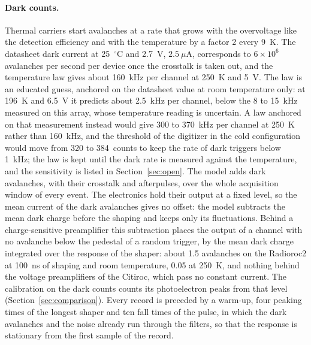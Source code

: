 \documentclass[11pt]{article}
\begin{document}
\paragraph{Dark counts.} Thermal carriers start avalanches at a rate that
grows with the overvoltage like the detection efficiency and with the
temperature by a factor 2 every 9~K. The datasheet dark current at
25~$^\circ$C and 2.7~V, $2.5~\mu$A, corresponds to $6 \times 10^6$
avalanches per second per device once the crosstalk is taken out, and the
temperature law gives about 160~kHz per channel at 250~K and 5~V. The law
is an educated guess, anchored on the datasheet value at room temperature
only: at 196~K
and 6.5~V it predicts about 2.5~kHz per channel, below the 8 to 15~kHz
measured on this array, whose temperature reading is uncertain. A law
anchored on that measurement instead would give 300 to 370~kHz per channel
at 250~K rather than 160~kHz, and the threshold of the digitizer in the
cold configuration would move from 320 to 384~counts to keep the rate of
dark triggers below 1~kHz; the law is kept until the dark rate is measured
against the temperature, and the sensitivity is listed in
Section~\ref{sec:open}. The model adds dark
avalanches, with their crosstalk and afterpulses, over the whole acquisition
window of every event. The electronics hold their output at a fixed level,
so the mean current of the dark avalanches gives no offset: the model
subtracts the mean dark charge before the shaping and keeps only its
fluctuations. Behind a charge-sensitive preamplifier this subtraction
places the output of a channel with no avalanche below the pedestal of a
random trigger, by the mean dark charge integrated over the response of
the shaper: about 1.5 avalanches on the Radioroc2 at 100~ns of shaping and
room temperature, 0.05 at 250~K, and nothing behind the voltage
preamplifiers of the Citiroc, which pass no constant current. The
calibration on the dark counts counts its photoelectron peaks from that
level (Section~\ref{sec:comparison}). Every record is preceded by a warm-up, four peaking times of
the longest shaper and ten fall times of the pulse, in which the dark
avalanches and the noise already run through the filters, so that the
response is stationary from the first sample of the record.
\end{document}
